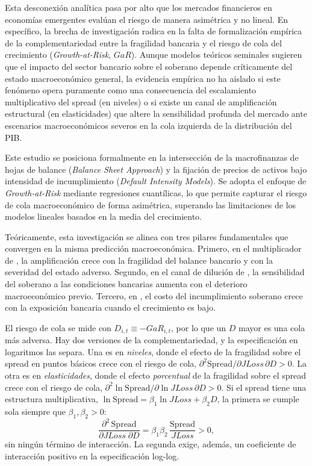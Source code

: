 Esta desconexión analítica pasa por alto que los mercados financieros en economías emergentes evalúan el riesgo de manera asimétrica y no lineal. En específico, la brecha de investigación radica en la falta de formalización empírica de la complementariedad entre la fragilidad bancaria y el riesgo de cola del crecimiento (\textit{Growth-at-Risk}, $GaR$). Aunque modelos teóricos seminales sugieren que el impacto del sector bancario sobre el soberano depende críticamente del estado macroeconómico general, la evidencia empírica no ha aislado si este fenómeno opera puramente como una consecuencia del escalamiento multiplicativo del spread (en niveles) o si existe un canal de amplificación estructural (en elasticidades) que altere la sensibilidad profunda del mercado ante escenarios macroeconómicos severos en la cola izquierda de la distribución del PIB.

Este estudio se posiciona formalmente en la intersección de la macrofinanzas de hojas de balance (\textit{Balance Sheet Approach}) y la fijación de precios de activos bajo intensidad de incumplimiento (\textit{Default Intensity Models}). Se adopta el enfoque de \textit{Growth-at-Risk} mediante regresiones cuantílicas, lo que permite capturar el riesgo de cola macroeconómico de forma asimétrica, superando las limitaciones de los modelos lineales basados en la media del crecimiento.

Teóricamente, esta investigación se alinea con tres pilares fundamentales que convergen en la misma predicción macroeconómica. Primero, en el multiplicador de \citet{FarhiTirole2018b}, la amplificación crece con la fragilidad del balance bancario y con la severidad del estado adverso. Segundo, en el canal de dilución de \citet{AcharyaDrechslerSchnabl2014b}, la sensibilidad del soberano a las condiciones bancarias aumenta con el deterioro macroeconómico previo. Tercero, en \citet{GennaioliMartinRossi2014}, el costo del incumplimiento soberano crece con la exposición bancaria cuando el crecimiento es bajo.

El riesgo de cola se mide con $D_{i,t}\equiv-GaR_{i,t}$, por lo que un $D$ mayor es una cola más adversa. Hay dos versiones de la complementariedad, y la especificación en logaritmos las separa. Una es en \emph{niveles}, donde el efecto de la fragilidad sobre el spread en puntos básicos crece con el riesgo de cola, $\partial^2\mathrm{Spread}/\partial JLoss\,\partial D>0$. La otra es en \emph{elasticidades}, donde el efecto \emph{porcentual} de la fragilidad sobre el spread crece con el riesgo de cola, $\partial^2\ln\mathrm{Spread}/\partial\ln JLoss\,\partial D>0$. Si el spread tiene una estructura multiplicativa, $\ln\mathrm{Spread}=\beta_1\ln JLoss+\beta_2 D$, la primera se cumple sola siempre que $\beta_1,\beta_2>0$:
\[
\frac{\partial^2\,\mathrm{Spread}}{\partial JLoss\;\partial D}=\beta_1\beta_2\,\frac{\mathrm{Spread}}{JLoss}>0,
\]
sin ningún término de interacción. La segunda exige, además, un coeficiente de interacción positivo en la especificación log-log.

